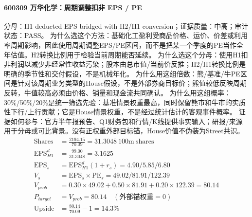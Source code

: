 \paragraph{600309 万华化学：周期调整扣非 EPS / PE}
分母：H1 deducted EPS bridged with H2/H1 conversion；证据质量：中高；审计状态：PASS。
为什么选这个方法：基础化工盈利受商品价格、运价、价差或利用率周期影响，因此使用周期调整EPS/PE区间，而不是把某一个季度的PE当作全年估值。H2转换比例用于检验当前周期能否延续。
为什么选这个分母：使用H1扣非利润以减少非经常性收益污染；股本由总市值/当前价反推；H2/H1转换比例是明确的季节性和交付假设，不是机械年化。
为什么用这组倍数：熊/基准/牛PE区间是针对该周期业务类型的House假设，不是外部券商目标价；熊值较低反映周期反转，牛值较高必须由价格、销量和现金流共同确认。
为什么用这组概率：30\%/50\%/20\%是统一筛选先验：基准情景权重最高，同时保留熊市和牛市的实质性下行/上行贡献；它是House情景权重，不是经过统计估计的客观事件概率。
证据如何参与：官方半年报预告、Q1财务包和行情/K线提供事实输入；研报/来源用于分母或可比背景。没有正权重外部目标锚，House价值不伪装为Street共识。
\begin{align*}
\mathrm{Shares} &= \frac{2194.15}{70.09}=31.3048\ \mathrm{100m\ shares}\\
\mathrm{EPS}_{H1}^d &= \frac{99.00}{31.3048}=3.1625\\
\mathrm{EPS}_s &= \mathrm{EPS}_{H1}^d(1+r_s)=4.90/5.85/6.80\\
V_s &= \mathrm{EPS}_s\times \mathrm{PE}_s=49.02/81.91/122.39\\
V_{prob} &= 0.30\times 49.02+0.50\times 81.91+0.20\times 122.39=80.14\\
P_{target} &= V_{prob}=80.14\quad(\text{外部锚权重}=0)\\
\mathrm{Upside} &= \frac{80.14}{70.09}-1=14.3\%\\
\end{align*}

